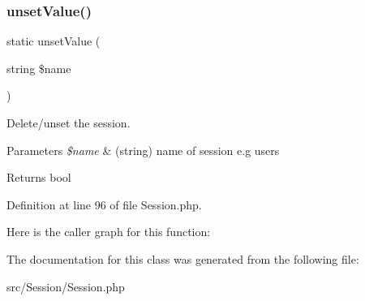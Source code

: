 \subsubsection{\texorpdfstring{unset\+Value()}{unsetValue()}}
{\footnotesize\ttfamily static unset\+Value (\begin{DoxyParamCaption}\item[{string}]{\$name }\end{DoxyParamCaption})\hspace{0.3cm}{\ttfamily [static]}}

Delete/unset the session.


\begin{DoxyParams}{Parameters}
{\em \$name} & (string) name of session e.\+g users\\
\hline
\end{DoxyParams}
\begin{DoxyReturn}{Returns}
bool 
\end{DoxyReturn}


Definition at line 96 of file Session.\+php.

Here is the caller graph for this function\+:


The documentation for this class was generated from the following file\+:\begin{DoxyCompactItemize}
\item 
src/\+Session/Session.\+php\end{DoxyCompactItemize}
